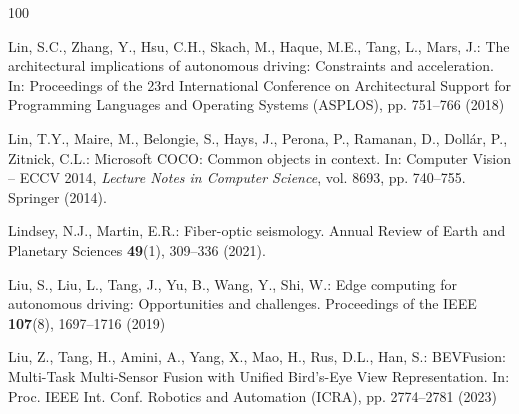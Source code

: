 \documentclass[graybox,envcountchap]{style/SNmono}
\begin{document}
\begin{thebibliography}{100}
{\par}
{\color{red} 
Lin, S.C., Zhang, Y., Hsu, C.H., Skach, M., Haque, M.E., Tang, L., Mars, J.:
  The architectural implications of autonomous driving: Constraints and
  acceleration.
\newblock In: Proceedings of the 23rd International Conference on Architectural
  Support for Programming Languages and Operating Systems (ASPLOS), pp.
  751--766 (2018)

\par}

Lin, T.Y., Maire, M., Belongie, S., Hays, J., Perona, P., Ramanan, D.,
  Doll{\'a}r, P., Zitnick, C.L.: Microsoft {COCO}: Common objects in context.
\newblock In: Computer Vision -- ECCV 2014, \emph{Lecture Notes in Computer
  Science}, vol. 8693, pp. 740--755. Springer (2014).
\newblock {}



Lindsey, N.J., Martin, E.R.: Fiber-optic seismology.
\newblock Annual Review of Earth and Planetary Sciences \textbf{49}(1),
  309--336 (2021).
\newblock {}


{\color{red} 
Liu, S., Liu, L., Tang, J., Yu, B., Wang, Y., Shi, W.: Edge computing for
  autonomous driving: Opportunities and challenges.
\newblock Proceedings of the IEEE \textbf{107}(8), 1697--1716 (2019)

\par}
{\color{red} 
Liu, Z., Tang, H., Amini, A., Yang, X., Mao, H., Rus, D.L., Han, S.:
  {BEVFusion: Multi-Task Multi-Sensor Fusion with Unified Bird's-Eye View
  Representation}.
\newblock In: Proc. IEEE Int. Conf. Robotics and Automation (ICRA), pp.
  2774--2781 (2023)

}
\end{thebibliography}
\end{document}
